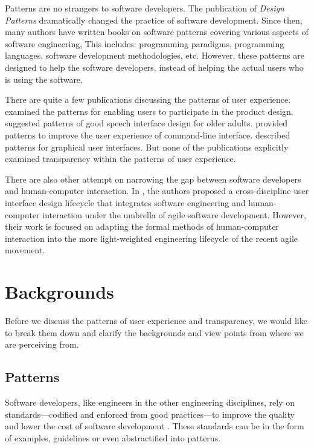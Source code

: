 \documentclass[a4paper,titlepage]{article}
\begin{document}
Patterns are no strangers to software developers. The publication of
\textit{Design Patterns} \citep{patterns:gamma} dramatically changed
the practice of software development. Since then, many authors have
written books on software patterns covering various aspects of
software engineering, This includes: programming paradigms,
programming languages, software development methodologies,
etc. However, these patterns are designed to help the software
developers, instead of helping the actual users who is using the
software.

There are quite a few publications discussing the patterns of user
experience. \citet{participatory:dearden} examined the patterns for
enabling users to participate in the product design.
\citet{speech:zajicek} suggested patterns of good speech interface
design for older adults. \citet{unix:raymond} provided patterns to
improve the user experience of command-line interface.
\citet{patterns:tidwell} described patterns for graphical user
interfaces. But none of the publications explicitly examined
transparency within the patterns of user experience.

There are also other attempt on narrowing the gap between software
developers and human-computer interaction. In \citet{agile:memmel},
the authors proposed a cross-discipline user interface design
lifecycle that integrates software engineering and human-computer
interaction under the umbrella of agile software development. However,
their work is focused on adapting the formal methods of human-computer
interaction into the more light-weighted engineering lifecycle of the
recent agile movement.


\section{Backgrounds}
\label{sec:backgrounds}
Before we discuss the patterns of user experience and transparency, we
would like to break them down and clarify the backgrounds and view
points from where we are perceiving from.

\subsection{Patterns}
\label{sec:patterns}
Software developers, like engineers in the other engineering
disciplines, rely on standards---codified and enforced from good
practices---to improve the quality and lower the cost of software
development \citep{practice:ipenz}. These standards can be in the form
of examples, guidelines or even abstractified into patterns.
\end{document}
